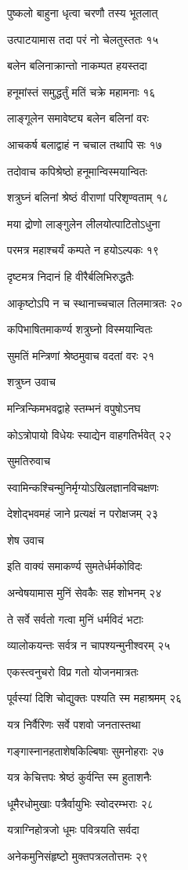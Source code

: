 पुष्कलो बाहुना धृत्वा चरणौ तस्य भूतलात्

उत्पाटयामास तदा परं नो चेलतुस्ततः १५

बलेन बलिनाक्रान्तो नाकम्पत हयस्तदा

हनूमांस्तं समुद्धर्तुं मतिं चक्रे महामनाः १६

लाङ्गूलेन समावेष्ट्य बलेन बलिनां वरः

आचकर्ष बलाद्वाहं न चचाल तथापि सः १७

तदोवाच कपिश्रेष्ठो हनूमान्विस्मयान्वितः

शत्रुघ्नं बलिनां श्रेष्ठं वीराणां परिशृण्वताम् १८

मया द्रोणो लाङ्गुलेन लीलयोत्पाटितोऽधुना

परमत्र महाश्चर्यं कम्पते न हयोऽल्पकः १९

दृष्टमत्र निदानं हि वीरैर्बलिभिरुद्धतैः

आकृष्टोऽपि न च स्थानाच्चचाल तिलमात्रतः २०

कपिभाषितमाकर्ण्य शत्रुघ्नो विस्मयान्वितः

सुमतिं मन्त्रिणां श्रेष्ठमुवाच वदतां वरः २१

शत्रुघ्न उवाच

मन्त्रिन्किमभवद्वाहे स्तम्भनं वपुषोऽनघ

कोऽत्रोपायो विधेयः स्याद्येन वाहगतिर्भवेत् २२

सुमतिरुवाच

स्वामिन्कश्चिन्मुनिर्मृग्योऽखिलज्ञानविचक्षणः

देशोद्भवमहं जाने प्रत्यक्षं न परोक्षजम् २३

शेष उवाच

इति वाक्यं समाकर्ण्य सुमतेर्धर्मकोविदः

अन्वेषयामास मुनिं सेवकैः सह शोभनम् २४

ते सर्वे सर्वतो गत्वा मुनिं धर्मविदं भटाः

व्यालोकयन्तः सर्वत्र न चापश्यन्मुनीश्वरम् २५

एकस्त्वनुचरो विप्र गतो योजनमात्रतः

पूर्वस्यां दिशि चोद्युक्तः पश्यति स्म महाश्रमम् २६

यत्र निर्वैरिणः सर्वे पशवो जनतास्तथा

गङ्गास्नानहताशेषकिल्बिषाः सुमनोहराः २७

यत्र केचित्तपः श्रेष्ठं कुर्वन्ति स्म हुताशनैः

धूमैरधोमुखाः पत्रैर्वायुभिः स्वोदरम्भराः २८

यत्राग्निहोत्रजो धूमः पवित्रयति सर्वदा

अनेकमुनिसंहृष्टो मुक्तपत्रलतोत्तमः २९

